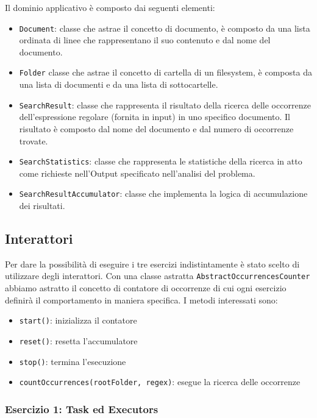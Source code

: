 \documentclass[a4paper]{article}
\begin{document}
Il dominio applicativo \`e composto dai seguenti elementi:

\begin{itemize}
%
    \item \texttt{Document}: classe che astrae il concetto di documento, \`e composto da una lista ordinata di linee che rappresentano il suo contenuto e dal nome del documento.
%
    \item \texttt{Folder} classe che astrae il concetto di cartella di un filesystem, \`e composta da una lista di documenti e da una lista di sottocartelle.
%
    \item \texttt{SearchResult}: classe che rappresenta il risultato della ricerca delle occorrenze dell'espressione regolare (fornita in input) in uno specifico documento.
%
    Il risultato \`e composto dal nome del documento e dal numero di occorrenze trovate.
%
    \item \texttt{SearchStatistics}: classe che rappresenta le statistiche della ricerca in atto come richieste nell'Output specificato nell'analisi del problema.
%
    \item \texttt{SearchResultAccumulator}: classe che implementa la logica di accumulazione dei risultati.
%
\end{itemize}

\subsection{Interattori}
Per dare la possibilità di eseguire i tre esercizi indistintamente è stato scelto di utilizzare degli interattori. Con una classe astratta \texttt{AbstractOccurrencesCounter} abbiamo astratto il concetto di contatore di occorrenze di cui ogni esercizio definirà il comportamento in maniera specifica.
I metodi interessati sono:
\begin{itemize}
    \item \texttt{start()}: inizializza il contatore 
    \item \texttt{reset()}: resetta l'accumulatore
    \item \texttt{stop()}: termina l'esecuzione
    \item \texttt{countOccurrences(rootFolder, regex)}: esegue la ricerca delle occorrenze
\end{itemize}

\subsubsection{Esercizio 1: Task ed Executors}
\end{document}
